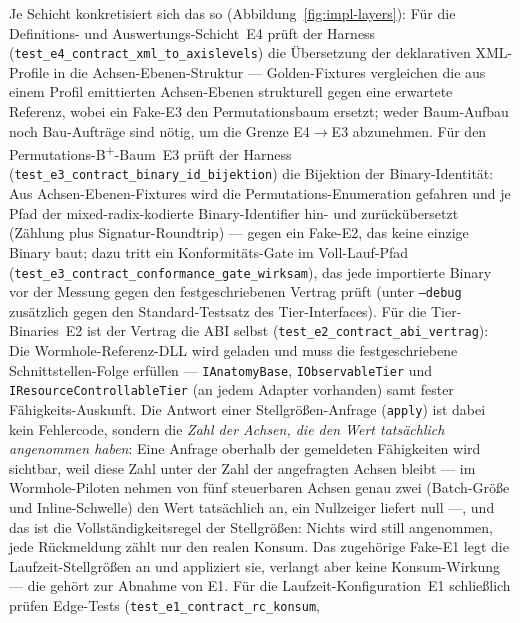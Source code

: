 \begin{nurlang}
Je Schicht konkretisiert sich das so (Abbildung~\ref{fig:impl-layers}): Für die Definitions- und
Auswertungs-Schicht~E4 prüft der Harness
(\texttt{test\_\allowbreak{}e4\_\allowbreak{}contract\_\allowbreak{}xml\_\allowbreak{}to\_\allowbreak{}axislevels})
die Übersetzung der deklarativen XML-Profile in die Achsen-Ebenen-Struktur --- Golden-Fixtures
vergleichen die aus einem Profil emittierten Achsen-Ebenen strukturell gegen eine erwartete Referenz,
wobei ein Fake-E3 den Permutationsbaum ersetzt; weder Baum-Aufbau noch Bau-Aufträge sind nötig, um die
Grenze E4$\to$E3 abzunehmen. Für den Permutations-B\textsuperscript{+}-Baum~E3 prüft der Harness
(\texttt{test\_\allowbreak{}e3\_\allowbreak{}contract\_\allowbreak{}binary\_\allowbreak{}id\_\allowbreak{}bijektion})
die Bijektion der Binary-Identität: Aus Achsen-Ebenen-Fixtures wird die Permutations-Enumeration gefahren
und je Pfad der mixed-radix-kodierte Binary-Identifier hin- und zurückübersetzt (Zählung plus
Signatur-Roundtrip) --- gegen ein Fake-E2, das keine einzige Binary baut; dazu tritt ein Konformitäts-Gate
im Voll-Lauf-Pfad
(\texttt{test\_\allowbreak{}e3\_\allowbreak{}contract\_\allowbreak{}conformance\_\allowbreak{}gate\_\allowbreak{}wirksam}),
das jede importierte Binary vor der Messung gegen den festgeschriebenen Vertrag prüft (unter
\texttt{--debug} zusätzlich gegen den Standard-Testsatz des Tier-Interfaces). Für die
Tier-Binaries~E2 ist der Vertrag die ABI selbst
(\texttt{test\_\allowbreak{}e2\_\allowbreak{}contract\_\allowbreak{}abi\_\allowbreak{}vertrag}): Die
Wormhole-Referenz-DLL wird geladen und muss die festgeschriebene Schnittstellen-Folge erfüllen ---
\texttt{IAnatomyBase}, \texttt{IObservableTier} und \texttt{IResourceControllableTier} (an jedem Adapter
vorhanden) samt fester Fähigkeits-Auskunft. Die Antwort einer Stellgrößen-Anfrage (\texttt{apply}) ist
dabei kein Fehlercode, sondern die \emph{Zahl der Achsen, die den Wert tatsächlich angenommen haben}: Eine
Anfrage oberhalb der gemeldeten Fähigkeiten wird sichtbar, weil diese Zahl unter der Zahl der angefragten
Achsen bleibt --- im Wormhole-Piloten nehmen von fünf steuerbaren Achsen genau zwei (Batch-Größe und
Inline-Schwelle) den Wert tatsächlich an, ein Nullzeiger liefert null ---, und das ist die
Vollständigkeitsregel der Stellgrößen: Nichts wird still angenommen, jede Rückmeldung zählt nur den
realen Konsum. Das zugehörige Fake-E1 legt die Laufzeit-Stellgrößen an und appliziert sie, verlangt aber
keine Konsum-Wirkung --- die gehört zur Abnahme von E1. Für die Laufzeit-Konfiguration~E1 schließlich
prüfen Edge-Tests (\texttt{test\_\allowbreak{}e1\_\allowbreak{}contract\_\allowbreak{}rc\_\allowbreak{}konsum},

\end{nurlang}
